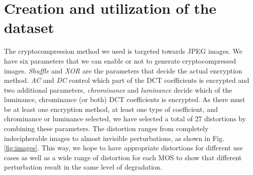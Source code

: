 \documentclass{article}
\begin{document}
\section{Creation and utilization of the dataset}
\label{sec:dataset}
The cryptocompression method we used is targeted towards JPEG images. We have six parameters that we can enable or not to generate cryptocompressed images. \textit{Shuffle} and \textit{XOR} are the parameters that decide the actual encryption method. \textit{AC} and \textit{DC} control which part of the DCT coefficients is encrypted and two additional parameters, \textit{chrominance} and \textit{luminance} decide which of the luminance, chrominance (or both) DCT coefficients is encrypted. As there must be at least one encryption method, at least one type of coefficient, and chrominance or luminance selected, we have selected a total of 27 distortions by combining these parameters. The distortion ranges from completely indecipherable images to almost invisible perturbations, as shown in Fig. \ref{fig:images}. This way, we hope to have appropriate distortions for different use cases as well as a wide range of distortion for each MOS to show that different perturbation result in the same level of degradation.
\end{document}
